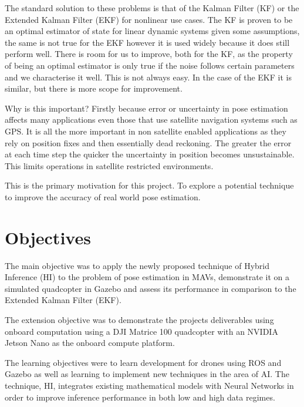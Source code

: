 \documentclass[]{../resources/final_report}
\begin{document}
The standard solution to these problems is that of the Kalman Filter (KF) or the Extended Kalman Filter (EKF) for nonlinear use cases. The KF is proven to be an optimal estimator of state for linear dynamic systems given some assumptions, the same is not true for the EKF however it is used widely because it does still perform well. There is room for us to improve, both for the KF, as the property of being an optimal estimator is only true if the noise follows certain parameters and we characterise it well. This is not always easy. In the case of the EKF it is similar, but there is more scope for improvement. 

Why is this important? Firstly because error or uncertainty in pose estimation affects many applications even those that use satellite navigation systems such as GPS. It is all the more important in non satellite enabled applications as they rely on position fixes and then essentially dead reckoning. The greater the error at each time step the quicker the uncertainty in position becomes unsustainable. This limits operations in satellite restricted environments.

This is the primary motivation for this project. To explore a potential technique to improve the accuracy of real world pose estimation.

\pagebreak

\section{Objectives}

The main objective was to apply the newly proposed technique of Hybrid Inference (HI) \cite{Satorras2019CombiningGA} to the problem of pose estimation in MAVs, demonstrate it on a simulated quadcopter in Gazebo and assess its performance in comparison to the Extended Kalman Filter (EKF). 

The extension objective was to demonstrate the projects deliverables using onboard computation using a DJI Matrice 100 quadcopter with an NVIDIA Jetson Nano as the onboard compute platform.

The learning objectives were to learn development for drones using ROS and Gazebo as well as learning to implement new techniques in the area of AI. The technique, HI, integrates existing mathematical models with Neural Networks in order to improve inference performance in both low and high data regimes.

\end{document}
